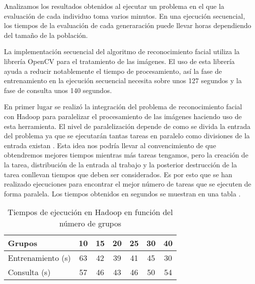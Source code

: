 \label{resultados-facerecognition}

Analizamos los resultados obtenidos al ejecutar un problema en el que la evaluación de cada individuo toma varios minutos. En una ejecuci\'on secuencial, los tiempos de la evaluación de cada generaraci\'on puede llevar horas dependiendo del tamaño de la población.

La implementaci\'on secuencial del algoritmo de reconocimiento facial utiliza la librer\'ia OpenCV para el tratamiento de las im\'agenes. El uso de esta librer\'ia ayuda a reducir notablemente el tiempo de procesamiento, as\'i la fase de entrenamiento en la ejecuci\'on secuencial necesita sobre unos 127 segundos y la fase de consulta unos 140 segundos. 

En primer lugar se realiz\'o la integraci\'on del problema de reconocimiento facial con Hadoop para paralelizar el procesamiento de las im\'agenes haciendo uso de esta herramienta. El nivel de paralelizaci\'on depende de como se divida la entrada del problema ya que se ejecutar\'an tantas tareas en paralelo como divisiones de la entrada existan . Esta idea nos podr\'ia llevar al convencimiento de que obtendremos mejores tiempos mientras m\'as tareas tengamos, pero la creaci\'on de la tarea, distribuci\'on de la entrada al trabajo y la posterior destrucci\'on de la tarea conllevan tiempos que deben ser considerados. Es por esto que se han realizado ejecuciones para encontrar el mejor n\'umero de tareas que se ejecuten de forma paralela. Los tiempos obtenidos en segundos se muestran en una tabla .

\begin{table}[H]
  \begin{center}
    \begin{center}
    \begin{tabular}{l | c c c c c c}
    Grupos & 10 & 15 & 20 & 25 & 30 & 40 \\ \hline
    Entrenamiento (s) & 63 & 42 & 39 & 41 & 45 & 30\\
    Consulta (s) & 57 & 46 & 43 & 46 & 50 & 54\\
    \end{tabular}
    \end{center}
    \caption{Tiempos de ejecución en Hadoop en funci\'on del n\'umero de grupos}
    \label{tabla-tiempos-num-grupos}
  \end{center}
\end{table}

